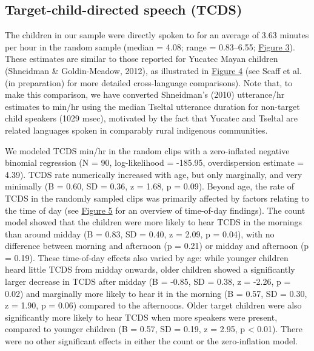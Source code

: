 \documentclass[floatsintext,man]{apa6}
\theoremstyle{definition}
\theoremstyle{definition}
\theoremstyle{definition}
\theoremstyle{remark}
\begin{document}
\subsection{Target-child-directed speech
(TCDS)}\label{target-child-directed-speech-tcds}

The children in our sample were directly spoken to for an average of
3.63 minutes per hour in the random sample (median = 4.08; range =
0.83--6.55; \protect\hyperlink{fig3}{Figure 3}). These estimates are
similar to those reported for Yucatec Mayan children (Shneidman \&
Goldin-Meadow, 2012), as illustrated in \protect\hyperlink{fig4}{Figure
4} (see Scaff et al. (in preparation) for more detailed cross-language
comparisons). Note that, to make this comparison, we have converted
Shneidman's (2010) utterance/hr estimates to min/hr using the median
Tseltal utterance duration for non-target child speakers (1029 msec),
motivated by the fact that Yucatec and Tseltal are related languages
spoken in comparably rural indigenous communities.

We modeled TCDS min/hr in the random clips with a zero-inflated negative
binomial regression (N = 90, log-likelihood = -185.95, overdispersion
estimate = 4.39). TCDS rate numerically increased with age, but only
marginally, and very minimally (B = 0.60, SD = 0.36, z = 1.68, p =
0.09). Beyond age, the rate of TCDS in the randomly sampled clips was
primarily affected by factors relating to the time of day (see
\protect\hyperlink{fig5}{Figure 5} for an overview of time-of-day
findings). The count model showed that the children were more likely to
hear TCDS in the mornings than around midday (B = 0.83, SD = 0.40, z =
2.09, p = 0.04), with no difference between morning and afternoon (p =
0.21) or midday and afternoon (p = 0.19). These time-of-day effects also
varied by age: while younger children heard little TCDS from midday
onwards, older children showed a significantly larger decrease in TCDS
after midday (B = -0.85, SD = 0.38, z = -2.26, p = 0.02) and marginally
more likely to hear it in the morning (B = 0.57, SD = 0.30, z = 1.90, p
= 0.06) compared to the afternoons. Older target children were also
significantly more likely to hear TCDS when more speakers were present,
compared to younger children (B = 0.57, SD = 0.19, z = 2.95, p
\textless{} 0.01). There were no other significant effects in either the
count or the zero-inflation model.
\end{document}
